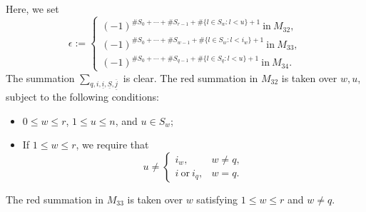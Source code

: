 \documentclass[12pt, a4paper]{article}
\begin{document}
Here, we set
$$
\epsilon:=\left\{
\begin{matrix}
(-1)^{\#S_0+\cdots+\#S_{r-1}+\#\{l\in S_w:l<u\}+1}~\mathrm{in}~M_{32},\\
(-1)^{\#S_0+\cdots+\#S_{w-1}+\#\{l\in S_w:l<i_w\}+1}~\mathrm{in}~M_{33},\\
(-1)^{\#S_0+\cdots+\#S_{q-1}+\#\{l\in S_q:l<u\}+1}~\mathrm{in}~M_{34}.
\end{matrix}
\right.
$$
The summation $\sum_{q,i,\underline i,\underline S,\underline{\overline j}}$ is clear. The red summation in $M_{32}$ is taken over $w,u$, subject to the following conditions:
\begin{itemize}
    \item $0\leq w\leq r$, $1\leq u\leq n$, and $u\in S_w$;
    \item If $1\leq w\leq r$, we require that
    $$
u\neq\left\{
\begin{matrix}
i_w,&w\neq q,\\
i~\mathrm{or}~i_q,& w=q.
\end{matrix}
\right.
$$
\end{itemize}
The red summation in $M_{33}$ is taken over $w$ satisfying $1\leq w\leq r$ and $w\neq q$.
\end{document}
